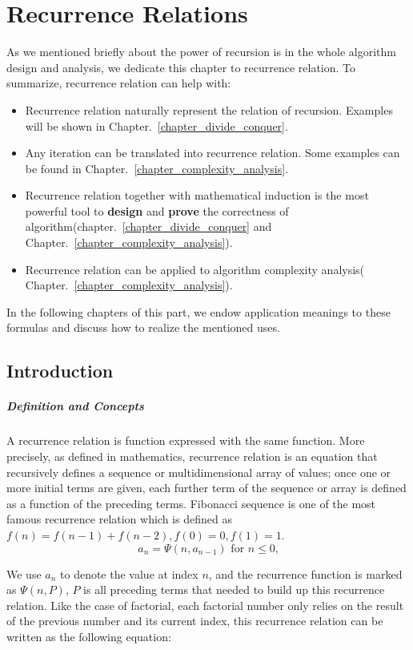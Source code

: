 \documentclass[../main.tex]{subfiles}
\begin{document}
\chapter{Recurrence Relations}
As we mentioned briefly about the power of recursion is in the whole algorithm design and analysis, we dedicate this chapter to recurrence relation. To summarize, recurrence relation can help with:
\begin{itemize}
    \item Recurrence relation naturally represent the relation of recursion. Examples will be shown in Chapter.~\ref{chapter_divide_conquer}.
    \item Any iteration can be translated into recurrence relation. Some examples can be found in Chapter.~\ref{chapter_complexity_analysis}.
    \item Recurrence relation together with mathematical induction is the most powerful tool to \textbf{design} and \textbf{prove} the correctness of algorithm(chapter.~\ref{chapter_divide_conquer} and Chapter.~\ref{chapter_complexity_analysis}).
    \item Recurrence relation can be applied to algorithm complexity analysis( Chapter.~\ref{chapter_complexity_analysis}).
\end{itemize}

In  the following chapters of this part, we endow application meanings to these formulas and discuss how to realize the mentioned uses. 

\section{Introduction}
\paragraph{Definition and Concepts} A recurrence relation is  function expressed with the same function. More precisely, as defined in mathematics, recurrence relation is an equation that recursively defines a sequence or multidimensional array of values; once one or more initial terms are given, each further term of the sequence or array is defined as a function of the preceding terms. Fibonacci sequence is one of the most famous recurrence relation which is defined as $f(n)=f(n-1)+f(n-2), f(0)=0, f(1)=1$.
\begin{equation}
    a_n = \Psi(n, a_{n-1})  \text{ for $n \leq 0$,}
\end{equation}

We use $a_n$ to denote the value at index $n$, and the recurrence function is marked as $\Psi(n, P)$, $P$ is all preceding terms that needed to build up this recurrence relation. Like the case of factorial, each factorial number only relies on the result of the previous number and its current index, this recurrence relation can be written as the following equation: 
\end{document}
